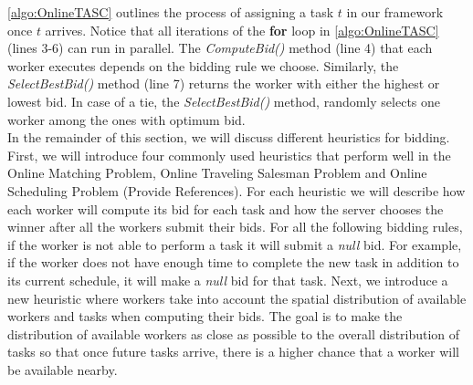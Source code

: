 \cref{algo:OnlineTASC} outlines the process of assigning a task $t$ in our framework once $t$ arrives. Notice that all iterations of the \textbf{for} loop in \cref{algo:OnlineTASC} (lines 3-6) can run in parallel. The \emph{ComputeBid()} method (line 4) that each worker executes depends on the bidding rule we choose. Similarly, the \emph{SelectBestBid()} method (line 7) returns the worker with either the highest or lowest bid. In case of a tie, the \emph{SelectBestBid()} method, randomly selects one worker among the ones with optimum bid.\\

In the remainder of this section, we will discuss different heuristics for bidding. First, we will introduce four commonly used heuristics that perform well in the Online Matching Problem, Online Traveling Salesman Problem and Online Scheduling Problem (Provide References). For each heuristic we will describe how each worker will compute its bid for each task and how the server chooses the winner after all the workers submit their bids. For all the following bidding rules, if the worker is not able to perform a task it will submit a \textit{null} bid. For example, if the worker does not have enough time to complete the new task in addition to its current schedule, it will make a \textit{null} bid for that task. Next, we introduce a new heuristic where workers take into account the spatial distribution of available workers and tasks when computing their bids. The goal is to make the distribution of available workers as close as possible to the overall distribution of tasks so that once future tasks arrive, there is a higher chance that a worker will be available nearby.

